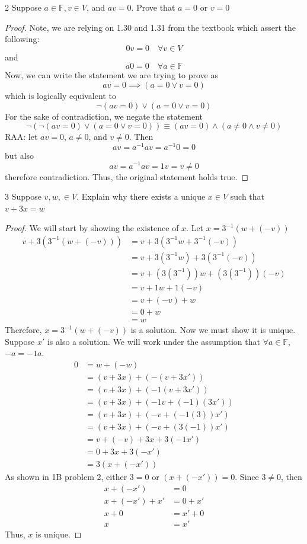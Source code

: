 \documentclass[12pt]{article}
\newenvironment{problem}[1]{\begin{prob*}{#1}{}}{\end{prob*}}
\newcommand{\F}{\mathbb{F}}
\begin{document}
\begin{problem}{2}
    Suppose $a\in \F, v\in V$, and $av=0$. Prove that $a=0$ or $v=0$
\end{problem}
\begin{proof}
    Note, we are relying on 1.30 and 1.31 from the textbook which assert the following:
    \[0v=0 \quad \forall v\in V\]
    and
    \[a0=0 \quad \forall a \in \F\]
    Now, we can write the statement we are trying to prove as
    \[av=0\implies (a=0 \lor v=0)\]
    which is logically equivalent to 
    \[\neg(av=0)\lor (a=0\lor v=0)\]
    For the sake of contradiction, we negate the statement 
    \[\neg(\neg(av=0)\lor (a=0 \lor v=0))\equiv (av=0)\land (a\ne0\land v\ne0)\]
    RAA: let $av=0$, $a\ne 0$, and $v \ne 0$. 
    Then 
    \[av=a^{-1}av=a^{-1}0=0\]
    but also
    \[av=a^{-1}av=1v=v\ne 0\]
    therefore contradiction. Thus, the original statement holds true.
\end{proof}
    \newpage
    \begin{problem}{3}
        Suppose $v,w,\in V$. Explain why there exists a unique $x\in V$ such that $v+3x=w$
    \end{problem}
    \begin{proof}
    We will start by showing the existence of $x$. 
    Let $x=3^{-1}(w+(-v))$
    \begin{align*}
        v+3(3^{-1}(w+(-v)))&=v+3(3^{-1}w+3^{-1}(-v))\\
        &=v+3(3^{-1}w)+3(3^{-1}(-v))\\
        &=v+(3(3^{-1}))w+(3(3^{-1}))(-v)\\
        &=v+1w+1(-v)\\
        &=v+(-v)+w\\
        &=0+w\\
        &=w
    \end{align*}
    Therefore, $x=3^{-1}(w+(-v))$ is a solution. Now we must show it is unique. Suppose $x'$ is also a solution. We will work under the assumption that $\forall a\in \F$, $-a=-1a$.
    \begin{align*}
        0&=w+(-w)\\
        &=(v+3x)+(-(v+3x'))\\
        &=(v+3x)+(-1(v+3x'))\\
        &=(v+3x)+(-1v+(-1)(3x'))\\
        &=(v+3x)+(-v+(-1(3))x')\\
        &=(v+3x)+(-v+(3(-1))x')\\
        &=v+(-v)+3x+3(-1x')\\
        &=0+3x+3(-x')\\
        &=3(x+(-x'))
    \end{align*}
    As shown in 1B problem 2, either $3=0$ or $(x+(-x'))=0$. Since $3\ne 0$, then
    \begin{align*}
        x+(-x')&=0\\
        x+(-x')+x'&=0+x'\\
        x+0&=x'+0\\
        x&=x'
    \end{align*}
    Thus, $x$ is unique. 
    \end{proof}
\end{document}
